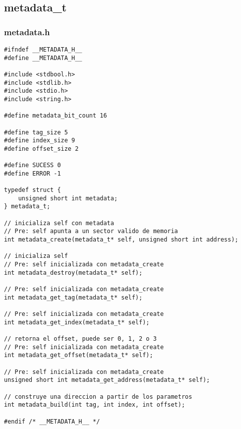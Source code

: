\documentclass[a4paper,10pt]{article}
\begin{document}
    \subsection{metadata\_t}
    \subsubsection{metadata.h}
    \begin{verbatim}
#ifndef __METADATA_H__
#define __METADATA_H__

#include <stdbool.h>
#include <stdlib.h>
#include <stdio.h>
#include <string.h>

#define metadata_bit_count 16

#define tag_size 5
#define index_size 9
#define offset_size 2

#define SUCESS 0
#define ERROR -1

typedef struct {
	unsigned short int metadata;
} metadata_t;

// inicializa self con metadata
// Pre: self apunta a un sector valido de memoria
int metadata_create(metadata_t* self, unsigned short int address);

// inicializa self
// Pre: self inicializada con metadata_create
int metadata_destroy(metadata_t* self);

// Pre: self inicializada con metadata_create
int metadata_get_tag(metadata_t* self);

// Pre: self inicializada con metadata_create
int metadata_get_index(metadata_t* self);

// retorna el offset, puede ser 0, 1, 2 o 3
// Pre: self inicializada con metadata_create
int metadata_get_offset(metadata_t* self);

// Pre: self inicializada con metadata_create
unsigned short int metadata_get_address(metadata_t* self);

// construye una direccion a partir de los parametros
int metadata_build(int tag, int index, int offset);

#endif /* __METADATA_H__ */
    \end{verbatim}
\end{document}
